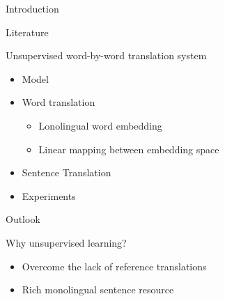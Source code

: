 \documentclass[11pt, a4paper, landscape]{article}
\begin{document}
	\TitlePage
	
	\NewPage
	
	
	\vfill
	\begin{description}
		\item Introduction
		\item Literature
		\item Unsupervised word-by-word translation system
			\begin{itemize}
				\item Model
				\item Word translation
					\begin{itemize}
						\item Lonolingual word embedding
						\item Linear mapping between embedding space
						 
					\end{itemize}
				\item Sentence Translation
				\item Experiments
			\end{itemize}
		\item Outlook
	\end{description}
	\vfill
	
	\NewPage
	
	\vfill
	\begin{description}
		\item Why unsupervised learning?
		\begin{itemize}
			\item Overcome the lack of reference translations
			\item Rich monolingual sentence resource \\
		\end{itemize}

		
	\end{description}
	\vfill
	

	
	
	
	\NewPage
	
\end{document}
